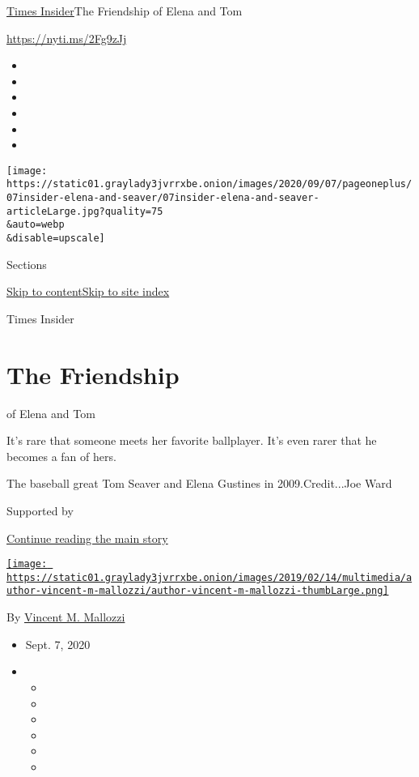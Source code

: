 \href{/section/reader-center}{Times Insider}\textbar{}The Friendship of
Elena and Tom

\url{https://nyti.ms/2Fg9zJj}

\begin{itemize}
\item
\item
\item
\item
\item
\item
\end{itemize}

\texttt{[image: https://static01.graylady3jvrrxbe.onion/images/2020/09/07/pageoneplus/07insider-elena-and-seaver/07insider-elena-and-seaver-articleLarge.jpg?quality=75\\\&auto=webp\\\&disable=upscale]}

Sections

\protect\hyperlink{site-content}{Skip to
content}\protect\hyperlink{site-index}{Skip to site index}

Times Insider

\hypertarget{the-friendship}{%
\section{The Friendship}\label{the-friendship}}

of Elena and Tom

It's rare that someone meets her favorite ballplayer. It's even rarer
that he becomes a fan of hers.

The baseball great Tom Seaver and Elena Gustines in 2009.Credit...Joe
Ward

Supported by

\protect\hyperlink{after-sponsor}{Continue reading the main story}

\href{https://www.nytimes3xbfgragh.onion/by/vincent-m-mallozzi}{\texttt{[image: https://static01.graylady3jvrrxbe.onion/images/2019/02/14/multimedia/author-vincent-m-mallozzi/author-vincent-m-mallozzi-thumbLarge.png]}}

By
\href{https://www.nytimes3xbfgragh.onion/by/vincent-m-mallozzi}{Vincent
M. Mallozzi}

\begin{itemize}
\item
  Sept. 7, 2020
\item
  \begin{itemize}
  \item
  \item
  \item
  \item
  \item
  \item
  \end{itemize}
\end{itemize}

